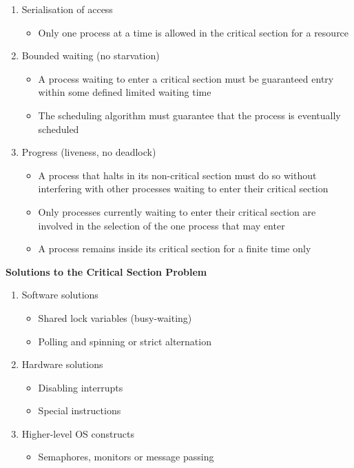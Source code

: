 \begin{enumerate}
  \item Serialisation of access
  \begin{itemize}
    \item Only one process at a time is allowed in the critical section for a resource
  \end{itemize}
  \item Bounded waiting (no starvation)
  \begin{itemize}
    \item A process waiting to enter a critical section must be guaranteed entry within some defined limited waiting time
    \item The scheduling algorithm must guarantee that the process is eventually scheduled
  \end{itemize}
  \item Progress (liveness, no deadlock)
  \begin{itemize}
    \item A process that halts in its non-critical section must do so without interfering with other processes waiting to enter their critical section
    \item Only processes currently waiting to enter their critical section are involved in the selection of the one process that may enter
    \item A process remains inside its critical section for a finite time only
  \end{itemize}
\end{enumerate}
\textbf{Solutions to the Critical Section Problem}
\begin{enumerate}
  \item Software solutions
  \begin{itemize}
    \item Shared lock variables (busy-waiting)
    \item Polling and spinning or strict alternation
  \end{itemize}
  \item Hardware solutions
  \begin{itemize}
    \item Disabling interrupts
    \item Special instructions
  \end{itemize}
  \item Higher-level OS constructs
  \begin{itemize}
    \item Semaphores, monitors or message passing
  \end{itemize}
\end{enumerate}

